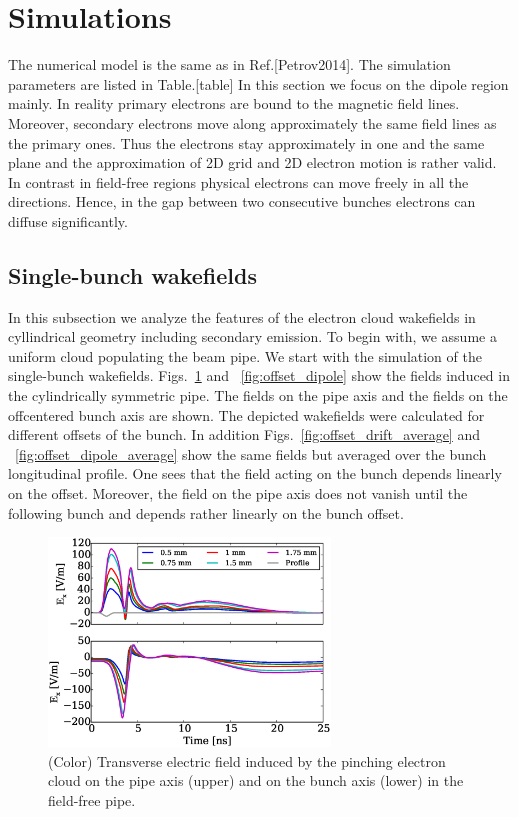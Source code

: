 \documentclass[1p]{elsarticle}%
\begin{document}
\section{Simulations}

	The numerical model is the same as in Ref.[Petrov2014].
	The simulation parameters are listed in Table.[table]
	In this section we focus on the dipole region mainly. 
	In reality primary electrons are bound to the magnetic field lines.
	Moreover, secondary electrons move along approximately the same field lines as the primary ones.
	Thus the electrons stay approximately in one and the same plane and the approximation of 2D grid and 2D electron motion is rather valid.
	In contrast in field-free regions physical electrons can move freely in all the directions.
	Hence, in the gap between two consecutive bunches electrons can diffuse significantly.

\subsection{Single-bunch wakefields}\label{sbw}

In this subsection we analyze the features of the electron cloud wakefields in cyllindrical geometry including secondary emission.
To begin with, we assume a uniform cloud populating the beam pipe.
We start with the simulation of the single-bunch wakefields.
Figs.~\ref{fig:offset_drift} and ~\ref{fig:offset_dipole} show the fields induced in the cylindrically symmetric pipe.
The fields on the pipe axis and the fields on the offcentered bunch axis are shown.
The depicted wakefields were calculated for different offsets of the bunch.
In addition Figs.~\ref{fig:offset_drift_average} and ~\ref{fig:offset_dipole_average} show the same fields but averaged over the bunch longitudinal profile.
One sees that the field acting on the bunch depends linearly on the offset.
Moreover, the field on the pipe axis does not vanish until the following bunch and depends rather linearly on the bunch offset.

\begin{figure}[htb] 
\centering
\includegraphics*[width=75mm]{./data/round_drift_offset.eps}
\caption{(Color) Transverse electric field induced by the pinching electron cloud on the pipe axis (upper) and on the bunch axis (lower) in the field-free pipe. }
\label{fig:offset_drift}
\end{figure}
\end{document}
